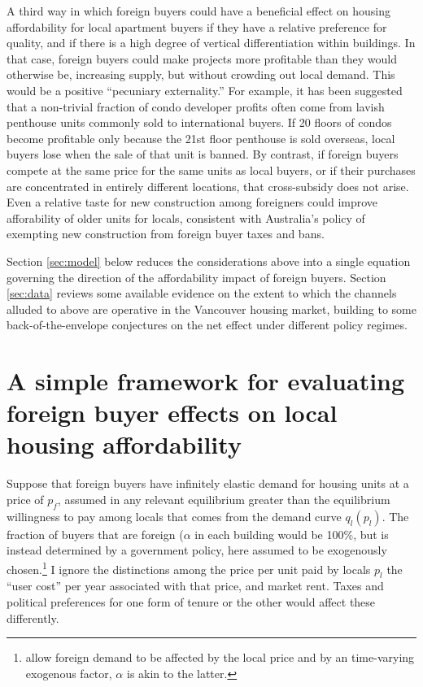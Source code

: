 \documentclass[12pt]{article}
\begin{document}
A third way in which foreign buyers could have a beneficial effect on housing
affordability for local apartment buyers if they have a relative preference for
quality, and if there is a high degree of vertical differentiation within
buildings. In that case, foreign buyers could make projects more profitable
than they would otherwise be, increasing supply, but without crowding out local
demand. This would be a positive ``pecuniary externality.'' For example, it has
been suggested that a non-trivial fraction of condo developer profits often
come from lavish penthouse units commonly sold to international buyers. If 20
floors of condos become profitable only because the 21st floor penthouse is
sold overseas, local buyers lose when the sale of that unit is banned. By
contrast, if foreign buyers compete at the same price for the same units as
local buyers, or if their purchases are concentrated in entirely different
locations, that cross-subsidy does not arise. Even a relative taste for new
construction among foreigners could improve afforability of older units for
locals, consistent with Australia's policy of exempting new construction from
foreign buyer taxes and bans.

Section \ref{sec:model} below reduces the considerations above into a single
equation governing the direction of the affordability impact of foreign buyers.
Section \ref{sec:data} reviews some available evidence on the extent to which
the channels alluded to above are operative in the Vancouver housing market,
building to some back-of-the-envelope conjectures on the net effect under
different policy regimes.

\section{\label{sec:model} A simple framework for evaluating foreign buyer effects on local housing affordability}

Suppose that foreign buyers have infinitely elastic demand for housing units at
a price of $p_{f}$, assumed in any relevant equilibrium greater than the
equilibrium willingness to pay among locals that comes from the demand curve
$q_{l}\left(p_{l}\right)$. The fraction of buyers that are foreign ($\alpha$ in
each building would be 100\%, but is instead determined by a government policy,
here assumed to be exogenously
chosen.\footnote{\textcite{favilukisVanNieuwerburgh} allow foreign demand to be
affected by the local price and by an time-varying exogenous factor, $\alpha$
is akin to the latter.} I ignore the distinctions among the price per unit paid
by locals $p_{l}$ the ``user cost'' per year associated with that price, and
market rent. Taxes and political preferences for one form of tenure or the
other would affect these differently.
\end{document}
